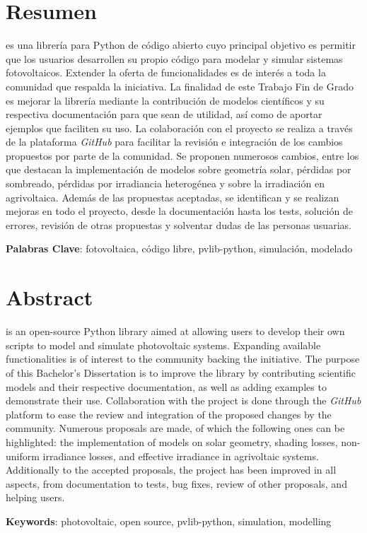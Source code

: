 \chapter*{Resumen} \label{chp:abstract}

\pvlibpy{} es una librería para Python de código abierto cuyo principal objetivo es permitir que los usuarios desarrollen su propio código para modelar y simular sistemas fotovoltaicos. Extender la oferta de funcionalidades es de interés a toda la comunidad que respalda la iniciativa. La finalidad de este Trabajo Fin de Grado es mejorar la librería mediante la contribución de modelos científicos y su respectiva documentación para que sean de utilidad, así como de aportar ejemplos que faciliten su uso. La colaboración con el proyecto se realiza a través de la plataforma \textit{GitHub} para facilitar la revisión e integración de los cambios propuestos por parte de la comunidad. Se proponen numerosos cambios, entre los que destacan la implementación de modelos sobre geometría solar, pérdidas por sombreado, pérdidas por irradiancia heterogénea y sobre la irradiación en agrivoltaica. Además de las propuestas aceptadas, se identifican y se realizan mejoras en todo el proyecto, desde la documentación hasta los tests, solución de errores, revisión de otras propuestas y solventar dudas de las personas usuarias.

\textbf{Palabras Clave}: fotovoltaica, código libre, pvlib-python, simulación, modelado


\newpage


\chapter*{Abstract}

\pvlibpy{} is an open-source Python library aimed at allowing users to develop their own scripts to model and simulate photovoltaic systems. Expanding available functionalities is of interest to the community backing the initiative. The purpose of this Bachelor's Dissertation is to improve the library by contributing scientific models and their respective documentation, as well as adding examples to demonstrate their use. Collaboration with the project is done through the \textit{GitHub} platform to ease the review and integration of the proposed changes by the community. Numerous proposals are made, of which the following ones can be highlighted: the implementation of models on solar geometry, shading losses, non-uniform irradiance losses, and effective irradiance in agrivoltaic systems. Additionally to the accepted proposals, the project has been improved in all aspects, from documentation to tests, bug fixes, review of other proposals, and helping users.

\textbf{Keywords}: photovoltaic, open source, pvlib-python, simulation, modelling
